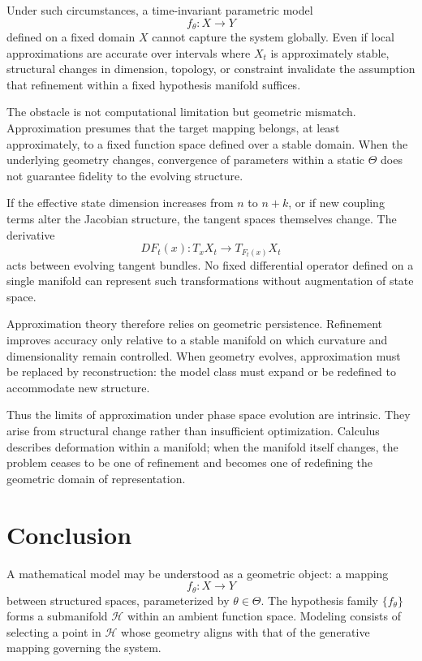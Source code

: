 \documentclass[12pt]{book}
\begin{document}
Under such circumstances, a time-invariant parametric model
\[
f_\theta : X \to Y
\]
defined on a fixed domain $X$ cannot capture the system globally. Even if local approximations are accurate over intervals where $X_t$ is approximately stable, structural changes in dimension, topology, or constraint invalidate the assumption that refinement within a fixed hypothesis manifold suffices.

The obstacle is not computational limitation but geometric mismatch. Approximation presumes that the target mapping belongs, at least approximately, to a fixed function space defined over a stable domain. When the underlying geometry changes, convergence of parameters within a static $\Theta$ does not guarantee fidelity to the evolving structure.

If the effective state dimension increases from $n$ to $n+k$, or if new coupling terms alter the Jacobian structure, the tangent spaces themselves change. The derivative
\[
DF_t(x) : T_x X_t \to T_{F_t(x)} X_t
\]
acts between evolving tangent bundles. No fixed differential operator defined on a single manifold can represent such transformations without augmentation of state space.

Approximation theory therefore relies on geometric persistence. Refinement improves accuracy only relative to a stable manifold on which curvature and dimensionality remain controlled. When geometry evolves, approximation must be replaced by reconstruction: the model class must expand or be redefined to accommodate new structure.

Thus the limits of approximation under phase space evolution are intrinsic. They arise from structural change rather than insufficient optimization. Calculus describes deformation within a manifold; when the manifold itself changes, the problem ceases to be one of refinement and becomes one of redefining the geometric domain of representation.

\section{Conclusion}

A mathematical model may be understood as a geometric object: a mapping
\[
f_\theta : X \to Y
\]
between structured spaces, parameterized by $\theta \in \Theta$. The hypothesis family $\{f_\theta\}$ forms a submanifold $\mathcal{H}$ within an ambient function space. Modeling consists of selecting a point in $\mathcal{H}$ whose geometry aligns with that of the generative mapping governing the system.
\end{document}
